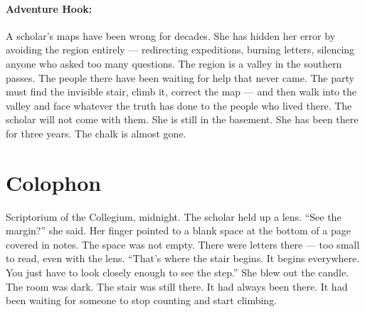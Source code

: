 \paragraph{Adventure Hook:}
A scholar's maps have been wrong for decades. She has hidden her error by avoiding the region entirely --- redirecting expeditions, burning letters, silencing anyone who asked too many questions. The region is a valley in the southern passes. The people there have been waiting for help that never came. The party must find the invisible stair, climb it, correct the map --- and then walk into the valley and face whatever the truth has done to the people who lived there. The scholar will not come with them. She is still in the basement. She has been there for three years. The chalk is almost gone.

\section*{Colophon}
Scriptorium of the Collegium, midnight. The scholar held up a lens. ``See the margin?'' she said. Her finger pointed to a blank space at the bottom of a page covered in notes. The space was not empty. There were letters there --- too small to read, even with the lens. ``That's where the stair begins. It begins everywhere. You just have to look closely enough to see the step.'' She blew out the candle. The room was dark. The stair was still there. It had always been there. It had been waiting for someone to stop counting and start climbing.